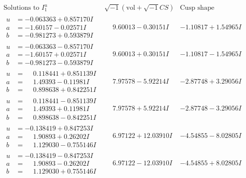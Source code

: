 \documentclass[1p]{elsarticle_modified}
\theoremstyle{definition}
\newcommand{\I}{\sqrt{-1}}
\begin{document}
$$\begin{array}{c|c|c}  
\text{Solutions to }I^u_{1}& \I (\text{vol} + \sqrt{-1}CS) & \text{Cusp shape}\\
 \hline 
\begin{aligned}
u &= -0.063363 + 0.857170 I \\
a &= -1.60157 - 0.02571 I \\
b &= -0.981273 + 0.593879 I\end{aligned}
 & \phantom{-}9.60013 - 0.30151 I & -1.10817 + 1.54965 I \\ \hline\begin{aligned}
u &= -0.063363 - 0.857170 I \\
a &= -1.60157 + 0.02571 I \\
b &= -0.981273 - 0.593879 I\end{aligned}
 & \phantom{-}9.60013 + 0.30151 I & -1.10817 - 1.54965 I \\ \hline\begin{aligned}
u &= \phantom{-}0.118441 + 0.851139 I \\
a &= \phantom{-}1.49393 - 0.11981 I \\
b &= \phantom{-}0.898638 + 0.842251 I\end{aligned}
 & \phantom{-}7.97578 - 5.92214 I & -2.87748 + 3.29056 I \\ \hline\begin{aligned}
u &= \phantom{-}0.118441 - 0.851139 I \\
a &= \phantom{-}1.49393 + 0.11981 I \\
b &= \phantom{-}0.898638 - 0.842251 I\end{aligned}
 & \phantom{-}7.97578 + 5.92214 I & -2.87748 - 3.29056 I \\ \hline\begin{aligned}
u &= -0.138419 + 0.847253 I \\
a &= \phantom{-}1.90893 + 0.26202 I \\
b &= \phantom{-}1.129030 - 0.755146 I\end{aligned}
 & \phantom{-}6.97122 + 12.03910 I & -4.54855 - 8.02805 I \\ \hline\begin{aligned}
u &= -0.138419 - 0.847253 I \\
a &= \phantom{-}1.90893 - 0.26202 I \\
b &= \phantom{-}1.129030 + 0.755146 I\end{aligned}
 & \phantom{-}6.97122 - 12.03910 I & -4.54855 + 8.02805 I \\ \hline\begin{aligned}

\end{aligned}
\end{array}$$
\end{document}

